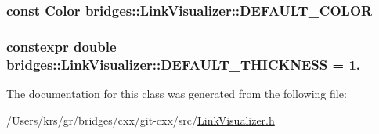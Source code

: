 \subsubsection[{D\+E\+F\+A\+U\+L\+T\+\_\+\+C\+O\+L\+O\+R}]{\setlength{\rightskip}{0pt plus 5cm}const {\bf Color} bridges\+::\+Link\+Visualizer\+::\+D\+E\+F\+A\+U\+L\+T\+\_\+\+C\+O\+L\+O\+R\hspace{0.3cm}{\ttfamily [static]}}\label{classbridges_1_1_link_visualizer_a7698ad5b243041377d81152a339d1282}
\hypertarget{classbridges_1_1_link_visualizer_ab790c33080c769008114db34d5ec8950}{}
\subsubsection[{D\+E\+F\+A\+U\+L\+T\+\_\+\+T\+H\+I\+C\+K\+N\+E\+S\+S}]{\setlength{\rightskip}{0pt plus 5cm}constexpr double bridges\+::\+Link\+Visualizer\+::\+D\+E\+F\+A\+U\+L\+T\+\_\+\+T\+H\+I\+C\+K\+N\+E\+S\+S = 1.\hspace{0.3cm}{\ttfamily [static]}}\label{classbridges_1_1_link_visualizer_ab790c33080c769008114db34d5ec8950}


The documentation for this class was generated from the following file\+:\begin{DoxyCompactItemize}
\item 
/\+Users/krs/gr/bridges/cxx/git-\/cxx/src/\hyperlink{_link_visualizer_8h}{Link\+Visualizer.\+h}\end{DoxyCompactItemize}
